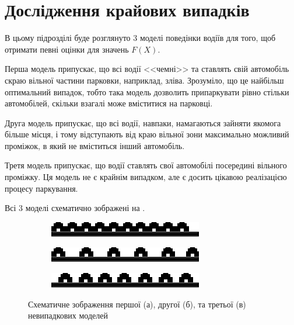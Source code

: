 \section{Дослідження крайових випадків}

В цьому підрозділі буде розглянуто 3 моделі поведінки водіїв для того, щоб отримати певні оцінки для значень $F(X)$.

Перша модель припускає, що всі водії <<чемні>> та ставлять свій автомобіль скраю вільної частини парковки, наприклад, зліва. Зрозуміло, що це найбільш оптимальний випадок, тобто така модель дозволить припаркувати рівно стільки автомобілей, скільки взагалі може вміститися на парковці.

Друга модель припускає, що всі водії, навпаки, намагаються зайняти якомога більше місця, і тому відступають від краю вільної зони максимально можливий проміжок, в який не вміститься інший автомобіль.

Третя модель припускає, що водії ставлять свої автомобілі посередині вільного проміжку. Ця модель не є крайнім випадком, але є досить цікавою реалізацією процесу паркування.

Всі 3 моделі схематично зображені на .

\begin{figure}[bh]
	\begin{subfigure}[b]{0.32\textwidth}    
		\centering
		\includegraphics[width=1\linewidth]{chapter_Asymptotics/img/parking_trivial1}
		\caption{}
	\end{subfigure}
	\begin{subfigure}[b]{0.32\textwidth}    
		\centering
		\includegraphics[width=1\linewidth]{chapter_Asymptotics/img/parking_trivial2}
		\caption{}
	\end{subfigure}
	\begin{subfigure}[b]{0.32\textwidth}    
		\centering
		\includegraphics[width=1\linewidth]{chapter_Asymptotics/img/parking_trivial3}
		\caption{}
	\end{subfigure}
	\caption{Схематичне зображення першої (а), другої (б), та третьої (в) невипадкових моделей}
	\label{fig:trivial_cases}
\end{figure}


